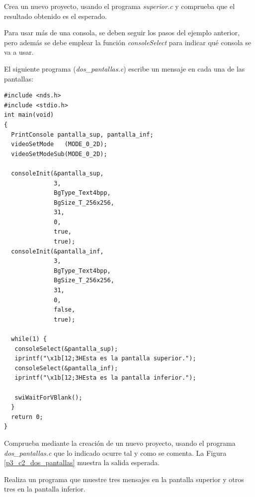 \begin{exercise}
Crea un nuevo proyecto, usando el programa \textit{superior.c} y comprueba que el resultado obtenido es el esperado.
\end{exercise}

Para usar más de una consola, se deben seguir los pasos del ejemplo anterior, pero además se debe emplear la función \textit{consoleSelect} para indicar qué consola se va a usar. 

\begin{example}
El siguiente programa (\textit{dos\_pantallas.c}) escribe un mensaje en cada una de las pantallas:

\begin{lstlisting}
#include <nds.h>
#include <stdio.h>
int main(void)
{
  PrintConsole pantalla_sup, pantalla_inf;  
  videoSetMode   (MODE_0_2D);
  videoSetModeSub(MODE_0_2D);
  
  consoleInit(&pantalla_sup, 
              3, 
              BgType_Text4bpp,
              BgSize_T_256x256, 
              31, 
              0,
              true, 
              true);
  consoleInit(&pantalla_inf,
              3,
              BgType_Text4bpp,
              BgSize_T_256x256,
              31,
              0,
              false,
              true);

  while(1) {  
   consoleSelect(&pantalla_sup);
   iprintf("\x1b[12;3HEsta es la pantalla superior.");
   consoleSelect(&pantalla_inf);
   iprintf("\x1b[12;3HEsta es la pantalla inferior.");

   swiWaitForVBlank();
  }
  return 0;
}
\end{lstlisting}
\end{example}

\begin{exercise}
Comprueba mediante la creación de un nuevo proyecto, usando el programa \textit{dos\_pantallas.c} que lo indicado ocurre tal y como se comenta. La Figura \ref{p3_c2_dos_pantallas} muestra la salida esperada.
\end{exercise}


\begin{exercise}
	Realiza un programa que muestre tres mensajes en la pantalla superior y otros tres en la pantalla inferior.
\end{exercise}

